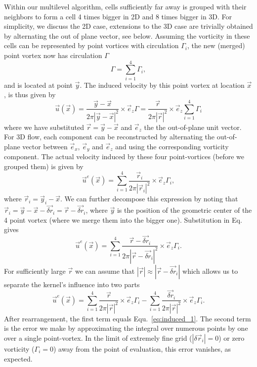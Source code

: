 \documentclass{article}
\begin{document}
Within our multilevel algorithm, cells sufficiently far away is grouped with their neighbors to form a cell 4 times bigger in 2D and 8 times bigger in 3D. For simplicity, we discuss the 2D case, extensions to the 3D case are trivially obtained by alternating the out of plane vector, see below. Assuming the vorticity in these cells can be represented by point vortices with circulation $\Gamma_i$, the new (merged) point vortex now has circulation $\Gamma$ 
\begin{equation}
    \Gamma = \sum_{i=1}^{4}\Gamma_i,
\end{equation}
and is located at point $\vec{y}$. The induced velocity by this point vortex at location $\vec x$, is thus given by
\begin{equation}\label{eq:induced_1}
    \vec{u}(\vec{x}) = \frac{\vec{y}-\vec{x}}{2\pi|\vec{y}-\vec{x}|^2}\times\vec{e}_z\Gamma = \frac{\vec{r}}{2\pi|\vec{r}|^2}\times\vec{e}_z\sum_{i=1}^{4}\Gamma_i
\end{equation}
where we have substituted $\vec{r}=\vec{y}-\vec{x}$ and $\vec{e}_z$ the the out-of-plane unit vector. For 3D flow, each component can be reconstructed by alternating the out-of-plane vector between $\vec{e}_x$, $\vec{e}_y$ and $\vec{e}_z$ and using the corresponding vorticity component. The actual velocity induced by these four point-vortices (before we grouped them) is given by
\begin{equation}
    \vec{u}^e(\vec{x}) = \sum_{i=1}^{4}\frac{\vec{r}_i}{2\pi|\vec{r}_i|^2}\times\vec{e}_z\Gamma_i,
\end{equation}
where $\vec{r}_i=\vec{y}_i-\vec{x}$. We can further decompose this expression by noting that $\vec{r}_i=\vec{y}-\vec{x}-\vec{\delta r}_i=\vec{r}-\vec{\delta r}_i$, where $\vec{y}$ is the position of the geometric center of the 4 point vortex (where we merge them into the bigger one). Substitution in Eq.~\theequation~ gives
\begin{equation}
    \vec{u}^e(\vec{x}) = \sum_{i=1}^{4}\frac{\vec{r}-\vec{\delta r}_i}{2\pi|\vec{r}-\vec{\delta r}_i|^2}\times\vec{e}_z\Gamma_i.
\end{equation}
For sufficiently large $\vec{r}$ we can assume that $|\vec{r}|\approx|\vec{r}-\vec{\delta r}_i|$ %
which allows us to separate the kernel's influence into two parts
\begin{equation}
    \vec{u}^e(\vec{x}) = \sum_{i=1}^{4}\frac{\vec{r}}{2\pi|\vec{r}|^2}\times\vec{e}_z\Gamma_i-\sum_{i=1}^{4}\frac{\vec{\delta r}_i}{2\pi|\vec{r}|^2}\times\vec{e}_z\Gamma_i.
\end{equation}
After rearrangement, the first term equals Equ.~\ref{eq:induced_1}. The second term is the error we make by approximating the integral over numerous points by one over a single point-vortex. In the limit of extremely fine grid ($|\delta \vec{r}_i|=0$) or zero vorticity ($\Gamma_i=0$) away from the point of evaluation, this error vanishes, as expected. 
\end{document}
